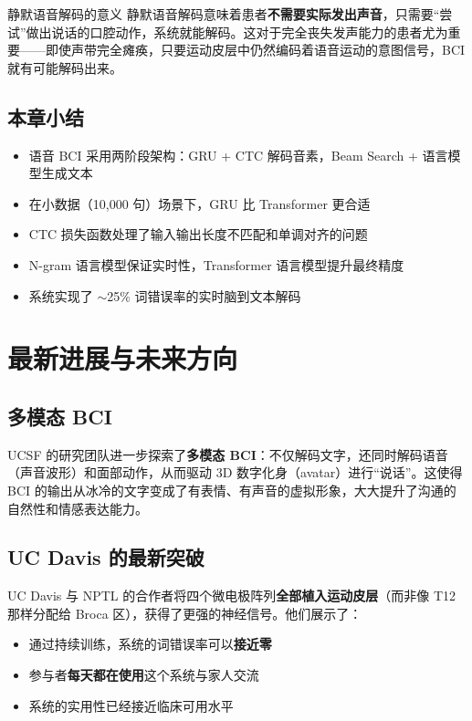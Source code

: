 \documentclass[a4paper]{article}
\begin{document}
\begin{knowledgebox}{静默语音解码的意义}
静默语音解码意味着患者\textbf{不需要实际发出声音}，只需要``尝试''做出说话的口腔动作，系统就能解码。这对于完全丧失发声能力的患者尤为重要——即使声带完全瘫痪，只要运动皮层中仍然编码着语音运动的意图信号，BCI 就有可能解码出来。
\end{knowledgebox}

\subsection{本章小结}

\begin{itemize}
    \item 语音 BCI 采用两阶段架构：GRU + CTC 解码音素，Beam Search + 语言模型生成文本
    \item 在小数据（10,000 句）场景下，GRU 比 Transformer 更合适
    \item CTC 损失函数处理了输入输出长度不匹配和单调对齐的问题
    \item N-gram 语言模型保证实时性，Transformer 语言模型提升最终精度
    \item 系统实现了 $\sim$25\% 词错误率的实时脑到文本解码
\end{itemize}


\section{最新进展与未来方向}

\subsection{多模态 BCI}

UCSF 的研究团队进一步探索了\textbf{多模态 BCI}：不仅解码文字，还同时解码语音（声音波形）和面部动作，从而驱动 3D 数字化身（avatar）进行``说话''。这使得 BCI 的输出从冰冷的文字变成了有表情、有声音的虚拟形象，大大提升了沟通的自然性和情感表达能力。

\subsection{UC Davis 的最新突破}

UC Davis 与 NPTL 的合作者将四个微电极阵列\textbf{全部植入运动皮层}（而非像 T12 那样分配给 Broca 区），获得了更强的神经信号。他们展示了：

\begin{itemize}
    \item 通过持续训练，系统的词错误率可以\textbf{接近零}
    \item 参与者\textbf{每天都在使用}这个系统与家人交流
    \item 系统的实用性已经接近临床可用水平
\end{itemize}
\end{document}
